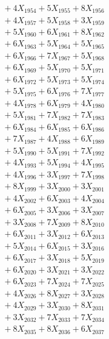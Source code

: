 \documentclass[a4paper,10pt]{article}
\begin{document}
{\begin{align}
&\;  + 4 X_{1954} + 5 X_{1955} + 8 X_{1956} \\[0.3ex]
&\;  + 4 X_{1957} + 5 X_{1958} + 3 X_{1959} \\[0.5ex]\allowbreak
&\;  + 5 X_{1960} + 6 X_{1961} + 8 X_{1962} \\[0.3ex]
&\;  + 6 X_{1963} + 5 X_{1964} + 5 X_{1965} \\[0.3ex]
&\;  + 6 X_{1966} + 7 X_{1967} + 5 X_{1968} \\[0.3ex]
&\;  + 6 X_{1969} + 5 X_{1970} + 5 X_{1971} \\[0.3ex]
&\;  + 6 X_{1972} + 5 X_{1973} + 5 X_{1974} \\[0.3ex]
&\;  + 5 X_{1975} + 6 X_{1976} + 7 X_{1977} \\[0.3ex]
&\;  + 4 X_{1978} + 6 X_{1979} + 4 X_{1980} \\[0.3ex]
&\;  + 5 X_{1981} + 7 X_{1982} + 7 X_{1983} \\[0.3ex]
&\;  + 6 X_{1984} + 6 X_{1985} + 6 X_{1986} \\[0.3ex]
&\;  + 7 X_{1987} + 4 X_{1988} + 6 X_{1989} \\[0.5ex]\allowbreak
&\;  + 5 X_{1990} + 5 X_{1991} + 7 X_{1992} \\[0.3ex]
&\;  + 4 X_{1993} + 5 X_{1994} + 4 X_{1995} \\[0.3ex]
&\;  + 4 X_{1996} + 3 X_{1997} + 7 X_{1998} \\[0.3ex]
&\;  + 8 X_{1999} + 3 X_{2000} + 3 X_{2001} \\[0.3ex]
&\;  + 4 X_{2002} + 6 X_{2003} + 4 X_{2004} \\[0.3ex]
&\;  + 6 X_{2005} + 3 X_{2006} + 3 X_{2007} \\[0.3ex]
&\;  + 3 X_{2008} + 7 X_{2009} + 8 X_{2010} \\[0.3ex]
&\;  + 6 X_{2011} + 3 X_{2012} + 6 X_{2013} \\[0.3ex]
&\;  + 5 X_{2014} + 6 X_{2015} + 3 X_{2016} \\[0.3ex]
&\;  + 6 X_{2017} + 3 X_{2018} + 5 X_{2019} \\[0.5ex]\allowbreak
&\;  + 6 X_{2020} + 3 X_{2021} + 3 X_{2022} \\[0.3ex]
&\;  + 6 X_{2023} + 7 X_{2024} + 7 X_{2025} \\[0.3ex]
&\;  + 4 X_{2026} + 8 X_{2027} + 3 X_{2028} \\[0.3ex]
&\;  + 4 X_{2029} + 3 X_{2030} + 8 X_{2031} \\[0.3ex]
&\;  + 3 X_{2032} + 7 X_{2033} + 7 X_{2034} \\[0.3ex]
&\;  + 8 X_{2035} + 8 X_{2036} + 6 X_{2037} \\[0.3ex]

\end{align}}
\end{document}
